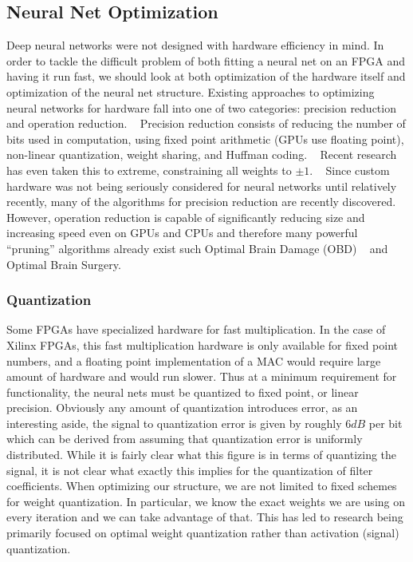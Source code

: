 \subsection{Neural Net Optimization}
Deep neural networks were not designed with hardware efficiency in mind.  In order to tackle the difficult problem of both fitting a neural net on an FPGA and having it run fast, we should look at both optimization of the hardware itself and optimization of the neural net structure.  Existing approaches to optimizing neural networks for hardware fall into one of two categories: precision reduction and operation reduction. ~\cite{DBLP:journals/corr/SzeCYE17}  Precision reduction consists of reducing the number of bits used in computation, using fixed point arithmetic (GPUs use floating point), non-linear quantization, weight sharing, and Huffman coding. ~\cite{DBLP:journals/corr/HanMD15} Recent research has even taken this to extreme, constraining all weights to $\pm 1$. ~\cite{DBLP:journals/corr/CourbariauxB16}  Since custom hardware was not being seriously considered for neural networks until relatively recently, many of the algorithms for precision reduction are recently discovered.  However, operation reduction is capable of significantly reducing size and increasing speed even on GPUs and CPUs and therefore many powerful ``pruning'' algorithms already exist such Optimal Brain Damage (OBD) ~\cite{Cun:1990:OBD:109230.109298} and Optimal Brain Surgery. ~\cite{Hassibi:1993:OBS:2987189.2987223}

\subsubsection{Quantization}
Some FPGAs have specialized hardware for fast multiplication.  In the case of Xilinx FPGAs, this fast multiplication hardware is only available for fixed point numbers, and a floating point implementation of a MAC would require large amount of hardware and would run slower.  Thus at a minimum requirement for functionality, the neural nets must be quantized to fixed point, or linear precision.  Obviously any amount of quantization introduces error, as an interesting aside, the signal to quantization error is given by roughly $6 dB$ per bit which can be derived from assuming that quantization error is uniformly distributed.  While it is fairly clear what this figure is in terms of quantizing the signal, it is not clear what exactly this implies for the quantization of filter coefficients.  When optimizing our structure, we are not limited to fixed schemes for weight quantization.  In particular, we know the exact weights we are using on every iteration and we can take advantage of that.  This has led to research being primarily focused on optimal weight quantization rather than activation (signal) quantization. ~\cite{DBLP:journals/corr/SzeCYE17}  

